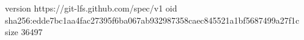 version https://git-lfs.github.com/spec/v1
oid sha256:edde7bc1aa4fac27395f6ba067ab932987358caec845521a1bf5687499a27f1c
size 36497
